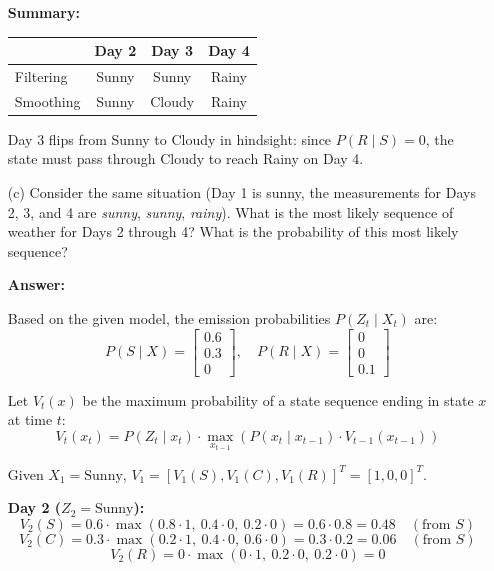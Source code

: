 \documentclass{article}
\begin{document}
\begin{enumerate}
    \vspace{1em}
    \textbf{Summary:}
    \begin{center}
    \begin{tabular}{lccc}
    \hline
    & \textbf{Day 2} & \textbf{Day 3} & \textbf{Day 4} \\
    \hline
    Filtering  & Sunny & Sunny  & Rainy \\
    Smoothing  & Sunny & Cloudy & Rainy \\
    \hline
    \end{tabular}
    \end{center}

    Day 3 flips from Sunny to Cloudy in hindsight: since $P(R \mid S) = 0$, the state must pass through Cloudy to reach Rainy on Day 4.

    \item[(c)] Consider the same situation (Day 1 is sunny, the measurements for Days 2, 3, and 4 are \textit{sunny}, \textit{sunny}, \textit{rainy}). What is the most likely sequence of weather for Days 2 through 4? What is the probability of this most likely sequence?

    \textbf{Answer:}

    Based on the given model, the emission probabilities $P(Z_t \mid X_t)$ are:
    $$ P(S \mid X) = \begin{bmatrix} 0.6 \\ 0.3 \\ 0 \end{bmatrix}, \quad P(R \mid X) = \begin{bmatrix} 0 \\ 0 \\ 0.1 \end{bmatrix} $$

    Let $V_t(x)$ be the maximum probability of a state sequence ending in state $x$ at time $t$:
    $$ V_t(x_t) = P(Z_t \mid x_t) \cdot \max_{x_{t-1}} \left( P(x_t \mid x_{t-1}) \cdot V_{t-1}(x_{t-1}) \right) $$

    Given $X_1 = \text{Sunny}$, $V_1 = [V_1(S), V_1(C), V_1(R)]^T = [1, 0, 0]^T$.

    \textbf{Day 2 ($Z_2 = \text{Sunny}$):}
    $$ V_2(S) = 0.6 \cdot \max(0.8 \cdot 1,\ 0.4 \cdot 0,\ 0.2 \cdot 0) = 0.6 \cdot 0.8 = 0.48 \quad (\text{from } S) $$
    $$ V_2(C) = 0.3 \cdot \max(0.2 \cdot 1,\ 0.4 \cdot 0,\ 0.6 \cdot 0) = 0.3 \cdot 0.2 = 0.06 \quad (\text{from } S) $$
    $$ V_2(R) = 0 \cdot \max(0 \cdot 1,\ 0.2 \cdot 0,\ 0.2 \cdot 0) = 0 $$


\end{enumerate}
\end{document}
